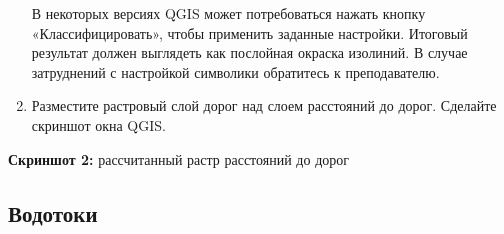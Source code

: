 \documentclass[
  12pt,
]{book}
\begin{document}
\begin{enumerate}
  В некоторых версиях QGIS может потребоваться нажать кнопку «Классифицировать», чтобы применить заданные настройки. Итоговый результат должен выглядеть как послойная окраска изолиний. В случае затруднений с настройкой символики обратитесь к преподавателю.
\item
  Разместите растровый слой дорог над слоем расстояний до дорог. Сделайте скриншот окна QGIS.
\end{enumerate}

\textbf{Скриншот 2:} рассчитанный растр расстояний до дорог

\hypertarget{weighted-overlay-streams}{%
\subsection{Водотоки}\label{weighted-overlay-streams}}
\end{document}
